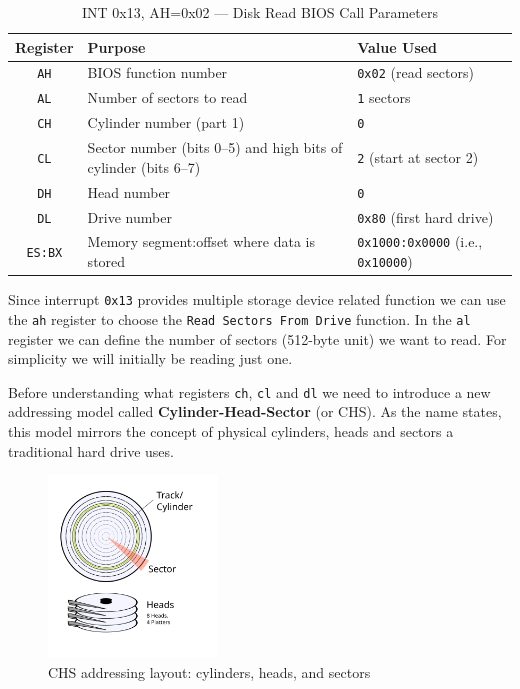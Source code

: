 \begin{table}[h]
    \centering
    \begin{tabular}{|c|p{5cm}|p{4cm}|}
    \hline
    \textbf{Register} & \textbf{Purpose} & \textbf{Value Used} \\ \hline
    \texttt{AH} & BIOS function number & \texttt{0x02} (read sectors) \\ \hline
    \texttt{AL} & Number of sectors to read & \texttt{1} sectors \\ \hline
    \texttt{CH} & Cylinder number (part 1) & \texttt{0} \\ \hline
    \texttt{CL} & Sector number (bits 0–5) and high bits of cylinder (bits 6–7) & \texttt{2} (start at sector 2) \\ \hline
    \texttt{DH} & Head number & \texttt{0} \\ \hline
    \texttt{DL} & Drive number & \texttt{0x80} (first hard drive) \\ \hline
    \texttt{ES:BX} & Memory segment:offset where data is stored & \texttt{0x1000:0x0000} (i.e., \texttt{0x10000}) \\ \hline
    \end{tabular}
    \caption{INT 0x13, AH=0x02 — Disk Read BIOS Call Parameters}
    \label{tab:disk_read_params}
\end{table}
    
Since interrupt \texttt{0x13} provides multiple storage device related function we can use the \texttt{ah} register
to choose the \texttt{Read Sectors From Drive} function.
In the \texttt{al} register we can define the number of sectors (512-byte unit) we want to read. For simplicity
we will initially be reading just one.

Before understanding what registers \texttt{ch}, \texttt{cl} and \texttt{dl} we need to introduce a new addressing
model called \textbf{Cylinder-Head-Sector} (or CHS). As the name states, this model mirrors the concept of physical 
cylinders, heads and sectors a traditional hard drive uses. 

\begin{figure}[H]
    \centering
    \includegraphics[width=0.4\textwidth]{images/chs_diagram.png}
    \caption{CHS addressing layout: cylinders, heads, and sectors}
    \label{fig:chs}
\end{figure}

